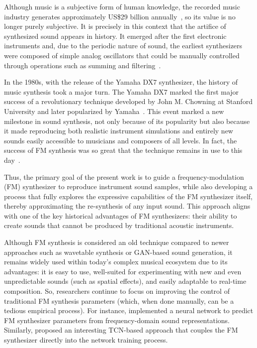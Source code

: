 \documentclass[10pt,conference]{IEEEtran}
\begin{document}
Although music is a subjective form of human knowledge, the recorded music industry generates approximately US\$29 billion annually~\cite{ifpi2025}, so its value is no longer purely subjective. It is precisely in this context that the artifice of synthesized sound appears in history. It emerged after the first electronic instruments and, due to the periodic nature of sound, the earliest synthesizers were composed of simple analog oscillators that could be manually controlled through operations such as summing and filtering~\cite{holmes2016electronic}.

In the 1980s, with the release of the Yamaha DX7 synthesizer, the history of music synthesis took a major turn. The Yamaha DX7 marked the first major success of a revolutionary technique developed by John M. Chowning at Stanford University and later popularized by Yamaha~\cite{claesson2021resynthesis}. This event marked a new milestone in sound synthesis, not only because of its popularity but also because it made reproducing both realistic instrument simulations and entirely new sounds easily accessible to musicians and composers of all levels. In fact, the success of FM synthesis was so great that the technique remains in use to this day~\cite{holmes2016electronic}.

Thus, the primary goal of the present work is to guide a frequency-modulation (FM) synthesizer to reproduce instrument sound samples, while also developing a process that fully explores the expressive capabilities of the FM synthesizer itself, thereby approximating the re-synthesis of any input sound. This approach aligns with one of the key historical advantages of FM synthesizers: their ability to create sounds that cannot be produced by traditional acoustic instruments.

Although FM synthesis is considered an old technique compared to newer approaches such as wavetable synthesis or GAN-based sound generation, it remains widely used within today’s complex musical ecosystem due to its advantages: it is easy to use, well-suited for experimenting with new and even unpredictable sounds (such as spatial effects), and easily adaptable to real-time composition. So, researchers continue to focus on improving the control of traditional FM synthesis parameters (which, when done manually, can be a tedious empirical process). For instance, \cite{claesson2021resynthesis} implemented a neural network to predict FM synthesizer parameters from frequency-domain sound representations. Similarly, \cite{steinmetz2022ddx7} proposed an interesting TCN-based approach that couples the FM synthesizer directly into the network training process.
\end{document}
